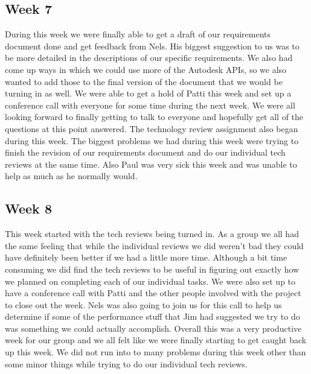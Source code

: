 \documentclass[10pt,draftclsnofoot,onecolumn]{IEEEtran}
\begin{document}
\subsection{Week 7}
During this week we were finally able to get a draft of our requirements document done and get feedback from Nels. His biggest suggestion to us was to be more detailed in the descriptions of our specific requirements. We also had come up ways in which we could use more of the Autodesk APIs, so we also wanted to add those to the final version of the document that we would be turning in as well. We were able to get a hold of Patti this week and set up a conference call with everyone for some time during the next week. We were all looking forward to finally getting to talk to everyone and hopefully get all of the questions at this point answered. The technology review assignment also began during this week. The biggest problems we had during this week were trying to finish the revision of our requirements document and do our individual tech reviews at the same time. Also Paul was very sick this week and was unable to help as much as he normally would. 

\subsection{Week 8}
This week started with the tech reviews being turned in. As a group we all had the same feeling that while the individual reviews we did weren't bad they could have definitely been better if we had a little more time. Although a bit time consuming we did find the tech reviews to be useful in figuring out exactly how we planned on completing each of our individual tasks. We were also set up to have a conference call with Patti and the other people involved with the project to close out the week. Nels was also going to join us for this call to help us determine if some of the performance stuff that Jim had suggested we try to do was something we could actually accomplish. Overall this was a very productive week for our group and we all felt like we were finally starting to get caught back up this week. We did not run into to many problems during this week other than some minor things while trying to do our individual tech reviews. 
\end{document}
